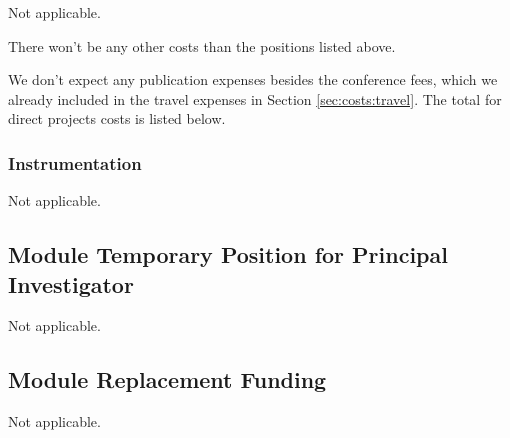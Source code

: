 



Not applicable. 


There won't be any other costs than the positions listed above. 


We don't expect any publication expenses besides the conference fees, which we already included in the travel expenses in Section \ref{sec:costs:travel}. The total for direct projects costs is listed below. 


\subsubsection{Instrumentation}

Not applicable. 

\subsection{Module Temporary Position for Principal Investigator}

Not applicable. 

\subsection{Module Replacement Funding}

Not applicable. 